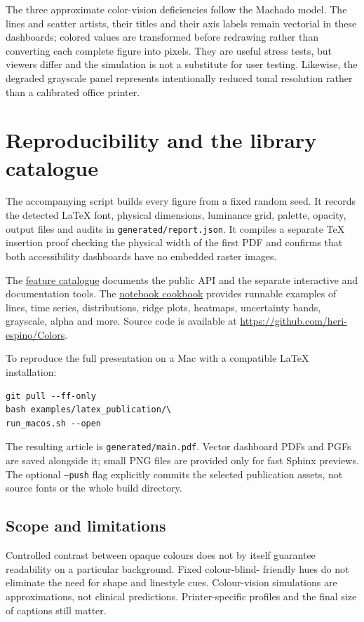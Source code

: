 \documentclass[10pt,twocolumn,a4paper]{article}
\begin{document}
The three approximate color-vision deficiencies follow the Machado model.
The lines and scatter artists, their titles and their axis labels remain
vectorial in these dashboards; colored values are transformed before
redrawing rather than converting each complete figure into pixels.
They are useful stress tests, but viewers differ and the simulation is
not a substitute for user testing. Likewise, the degraded grayscale
panel represents intentionally reduced tonal resolution rather than
a calibrated office printer.

\section{Reproducibility and the library catalogue}
The accompanying script builds every figure from a
fixed random seed. It records the detected LaTeX
font, physical dimensions, luminance grid,
palette, opacity, output files and audits in
\texttt{generated/report.json}. It compiles a
separate TeX insertion proof checking the
physical width of the first PDF and confirms that
both accessibility dashboards have no embedded
raster images.

The \href{https://heri-espino.github.io/Colors/features.html}
{feature catalogue} documents the public API
and the separate interactive and documentation
tools. The \href{https://heri-espino.github.io/Colors/notebooks/index.html}
{notebook cookbook} provides runnable examples
of lines, time series, distributions, ridge
plots, heatmaps, uncertainty bands, grayscale,
alpha and more. Source code is available at
\url{https://github.com/heri-espino/Colors}.

To reproduce the full presentation on a Mac
with a compatible LaTeX installation:
\begin{verbatim}
git pull --ff-only
bash examples/latex_publication/\
run_macos.sh --open
\end{verbatim}
The resulting article is
\texttt{generated/main.pdf}. Vector dashboard
PDFs and PGFs are saved alongside it; small
PNG files are provided only for fast Sphinx
previews. The optional \texttt{--push} flag
explicitly commits the selected publication
assets, not source fonts or the whole build
directory.

\subsection{Scope and limitations}
Controlled contrast between opaque colours
does not by itself guarantee readability on
a particular background. Fixed colour-blind-
friendly hues do not eliminate the need for
shape and linestyle cues. Colour-vision
simulations are approximations, not clinical
predictions. Printer-specific profiles and
the final size of captions still matter.
\end{document}
